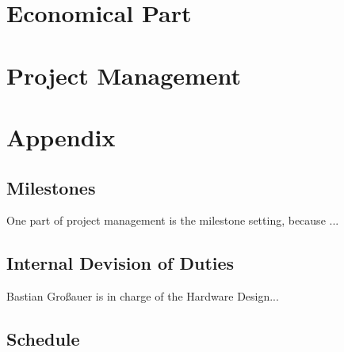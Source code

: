 \documentclass[12pt]{article}
\begin{document}

\cleardoublepage



\section{Economical Part}



\cleardoublepage


\section{Project Management}



\cleardoublepage


\appendix

\section{Appendix}


\subsection{Milestones}

One part of project management is the milestone setting, because ...


\subsection{Internal Devision of Duties}

Bastian Großauer is in charge of the Hardware Design...

\subsection{Schedule}
\end{document}
